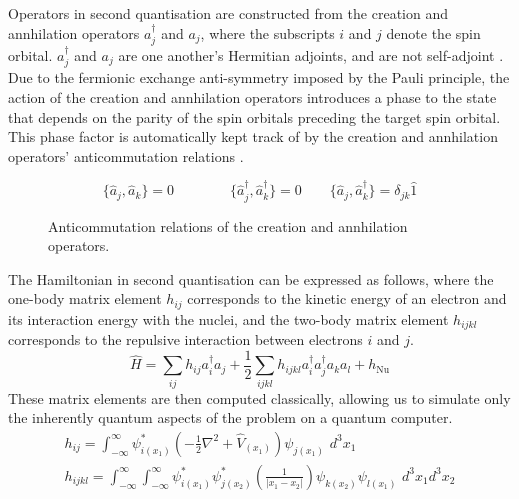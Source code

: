 Operators in second quantisation are constructed from the creation and annhilation operators $a_j^\dagger$ and $a_j$, where the subscripts $i$ and $j$ denote the spin orbital. $a_j^\dagger$ and $a_j$ are one another's Hermitian adjoints, and are not self-adjoint \cite{Helgaker2000}. Due to the fermionic exchange anti-symmetry imposed by the Pauli principle, the action of the creation and annhilation operators introduces a phase to the state that depends on the parity of the spin orbitals preceding the target spin orbital. This phase factor is automatically kept track of by the creation and annhilation operators' anticommutation relations \cite{Helgaker2000}.
\begin{figure}[H]
    \centering
    \begin{equation*}
        \{ \hat a_{j}, \hat a_{k} \} = 0 \qquad \qquad
        \{ \hat a_{j}^{\dagger}, \hat a_{k}^{\dagger} \} = 0 \qquad
        \{ \hat a_{j}, \hat a_{k}^{\dagger} \} = \delta_{jk} \hat{1}
    \end{equation*}
    \caption{Anticommutation relations of the creation and annhilation operators.}
    \label{anticommutation-relations}
\end{figure}
The Hamiltonian in second quantisation can be expressed as follows, where the one-body matrix element $h_{ij}$ corresponds to the kinetic energy of an electron and its interaction energy with the nuclei, and the two-body matrix element $h_{ijkl}$ corresponds to the repulsive interaction between electrons $i$ and $j$.
\begin{equation*}
    \hat H =
    \sum_{ij} h_{ij} a^\dagger_i a_j +
    \frac{1}{2} \sum_{ijkl} h_{ijkl} a^\dagger_i a^\dagger_j a_k a_l +
    h_\text{Nu}
\end{equation*}
These matrix elements are then computed classically, allowing us to simulate only the inherently quantum aspects of the problem on a quantum computer.
\begin{gather*}
h_{ij} = \int^\infty_{-\infty} \psi^*_{i(x_1)} \left( - \frac{1}{2} \nabla^2 + \hat V_{(x_1)} \right) \psi_{j(x_1)} \,\, d^3 x_1 \\[3ex]
%
h_{ijkl} = \int^\infty_{-\infty} \int^\infty_{-\infty} \psi^*_{i(x_1)} \psi^*_{j(x_2)} \left( \frac{1}{|x_1 - x_2|} \right) \psi_{k(x_2)} \psi_{l(x_1)} \,\, d^3 x_1 d^3 x_2
\end{gather*}
